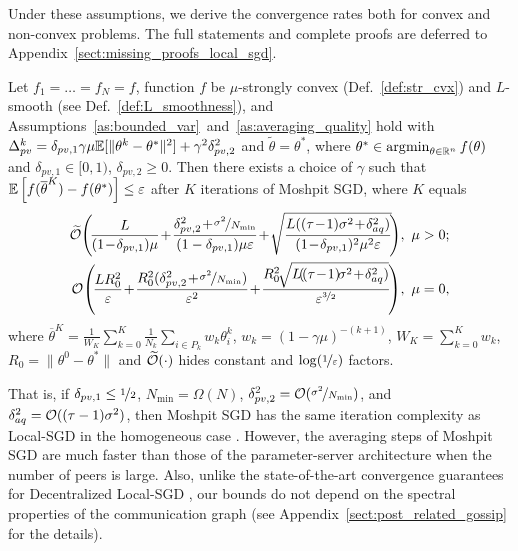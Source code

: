 Under these assumptions, we derive the convergence rates both for convex and non-convex problems. The full statements and complete proofs are deferred to Appendix~\ref{sect:missing_proofs_local_sgd}.
\begin{theorem}\label{thm:cvx_convergence}
    Let $f_1 = \ldots = f_N = f$, function $f$ be $\mu$-strongly convex (Def.~\ref{def:str_cvx}) and $L$-smooth (see Def.~\ref{def:L_smoothness}), and Assumptions~\ref{as:bounded_var}~and~\ref{as:averaging_quality} hold with $\Delta_{pv}^k = \delta_{pv,1}\gamma\mu\mathbb{E}[\|\theta^k-\theta^*\|^2] + \gamma^2\delta_{pv,2}^2$ and $\widetilde{\theta} = \theta^*$, where $\theta^* \in \mathop{\arg\!\min}_{\theta\in\mathbb{R}^n} f(\theta)$ and $\delta_{pv,1}\in [0,1)$, $\delta_{pv,2}\ge 0$. Then there exists a choice of $\gamma$ such that $\mathbb{E}\left[f(\overline{\theta}^K) - f(\theta^*)\right]\le \varepsilon$ after $K$ iterations of Moshpit SGD, where $K$ equals
    \vspace{-2pt}
    \begin{align}
        \widetilde{\cO}\!\left(\!\frac{L}{(1\!-\!\delta_{pv,1})\mu}\! +\! \frac{\delta_{pv,2}^2\!+\!\nicefrac{\sigma^2}{N_{\min}}}{(1-\delta_{pv,1})\mu\varepsilon}\! +\! \sqrt{\frac{L((\tau\!-\!1)\sigma^2\!+\!\delta_{aq}^2)}{(1\!-\!\delta_{pv,1})^2\mu^2\varepsilon}}\!\right)&,\ \mu>0;\\
        \cO\!\left(\!\frac{LR_0^2}{\varepsilon}\!+\! \frac{R_0^2(\delta_{pv,2}^2\!+\!\nicefrac{\sigma^2}{N_{\min}})}{\varepsilon^2}\!+\! \frac{R_0^2\!\sqrt{L\!(\!(\tau\!-\!1)\!\sigma^2\!+\!\delta_{aq}^2)}}{\varepsilon^{\nicefrac{3}{2}}}\!\right)&,\ \mu=0,
    \end{align}
    where $\overline{\theta}^K = \frac{1}{W_K}\sum\limits_{k=0}^K\frac{1}{N_k}\sum\limits_{i\in P_k} w_k \theta_i^k$, $w_k = (1-\gamma\mu)^{-(k+1)}$, $W_K = \sum_{k=0}^Kw_k$, $R_0 = \|\theta^0 - \theta^*\|$ and $\widetilde{{\cal O}}(\cdot)$ hides constant and $\log(\nicefrac{1}{\varepsilon})$ factors.
\end{theorem}
That is, if $\delta_{pv,1} \le \nicefrac{1}{2}$, $N_{\min} = \Omega(N)$, $\delta_{pv,2}^2 = {\cal O}(\nicefrac{\sigma^2}{N_{\min}})$, and $\delta_{aq}^2 = {\cal O}((\tau-1)\sigma^2)$, then Moshpit SGD has the same iteration complexity as Local-SGD in the homogeneous case \cite{khaled2020tighter,woodworth2020local}. However, the averaging steps of Moshpit SGD are much faster than those of the parameter-server architecture when the number of peers is large. Also, unlike the state-of-the-art convergence guarantees for Decentralized Local-SGD \cite{koloskova2020unified}, our bounds do not depend on the spectral properties of the communication graph (see Appendix~\ref{sect:post_related_gossip} for the details).

